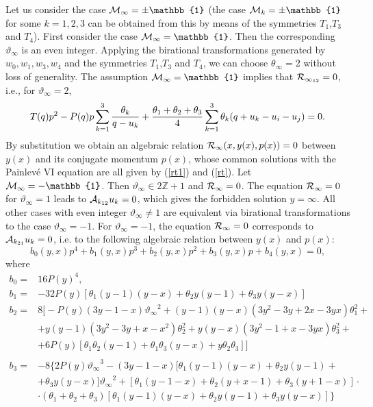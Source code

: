 \documentclass[12pt]{article}
\def\thi{{\vartheta_\infty}}
\newcommand{\ID}{\mathbb{1}}
\newcommand {\interi}{\mathbb Z}
\theoremstyle{definition}
\theoremstyle{theorem}
\begin{document}
 Let us consider the case 
${\cal M}_\infty=\pm\ID$ (the case ${\cal M}_k=\pm\ID$ for
some $k=1,2,3$ can be obtained from this by means of the symmetries
$T_1$,$T_3$ and $T_4$). First consider the case ${\cal M}_\infty=\ID$. 
Then the corresponding $\thi$ is an even integer. Applying the birational 
transformations generated by $w_0,w_1,w_3,w_4$ and the symmetries 
$T_1$,$T_3$ and $T_4$, we can choose $\theta_\infty=2$ without
loss of generality. The assumption ${\cal M}_\infty=\ID$ implies that 
${\cal R}_{\infty_{12}}=0$, i.e., for $\thi=2$,
$$
T(q) p^2-P(q) p 
\sum_{k=1}^3{\theta_k\over q-u_k} +{\theta_1+\theta_2+\theta_3\over 4} 
\sum_{k=1}^3\theta_k (q+u_k-u_i-u_j)=0.
$$
By substitution we obtain an algebraic relation 
${\cal R}_\infty(x,y(x),p(x))=0$ between $y(x)$ and its conjugate
momentum $p(x)$, whose common solutions with the Painlev\'e VI
equation are all given by (\ref{rt1}) and (\ref{rt}).
Let ${\cal M}_\infty=-\ID$. Then $\thi\in 2\interi+1$ and 
${\cal R}_\infty=0$. The equation ${\cal R}_\infty=0$ for $\thi=1$
leads to ${\cal A}_{k_{12}} u_k=0$,
which gives the forbidden solution $y=\infty$. All other cases with
even integer $\thi\neq 1$ are equivalent via birational
transformations to the case $\thi=-1$. 
For $\thi=-1$, the equation ${\cal R}_\infty=0$ corresponds to
${\cal A}_{k_{21}} u_k=0$, i.e. to the following algebraic relation
between $y(x)$ and $p(x)$:
$$
b_0(y,x)p^4+b_1(y,x) p^3+b_2(y,x)p^2+b_3(y,x)p+b_4(y,x)=0,
$$
where 
$$
\begin{array}{cl}
b_0 =& 16 P(y)^4,\\ 
b_1 = &-32 P(y)\left[\theta_1(y-1)(y-x)+\theta_2 y(y-1)+
\theta_3 y (y-x)\right]\\ 
b_2 =&8 \big[-P(y)(3y-1-x)\thi^2+(y-1)(y-x)(3 y^2-3 y+2x-3y x)
\theta_1^2+\\ 
&+y(y-1)(3 y^2-3 y+x-x^2)\theta_2^2+y(y-x)
(3 y^2-1+x-3 y x)\theta_3^2+\\ 
&+6 P(y)\left[\theta_1 \theta_2 (y-1)+
\theta_1 \theta_3(y-x)+y \theta_2 \theta_3\right]\big]\\ 
\end{array}
$$
$$
\begin{array}{cl}
b_3=&-8\bigg\{2 P(y)\thi^3 - (3y-1-x)
\big[\theta_1 (y-1)(y-x)+\theta_2 y(y-1)+\\
&+\theta_3y(y-x)\big]\thi^2+
\left[\theta_1 (y-1-x)+\theta_2(y+x-1)+ \theta_3(y+1-x)\right]\cdot\\ 
&\cdot(\theta_1+\theta_2+\theta_3)
\left[\theta_1(y-1)(y-x)+ \theta_2y(y-1) +\theta_3y(y-x)\right]
\bigg\}\\ \end{array}
$$
\end{document}
